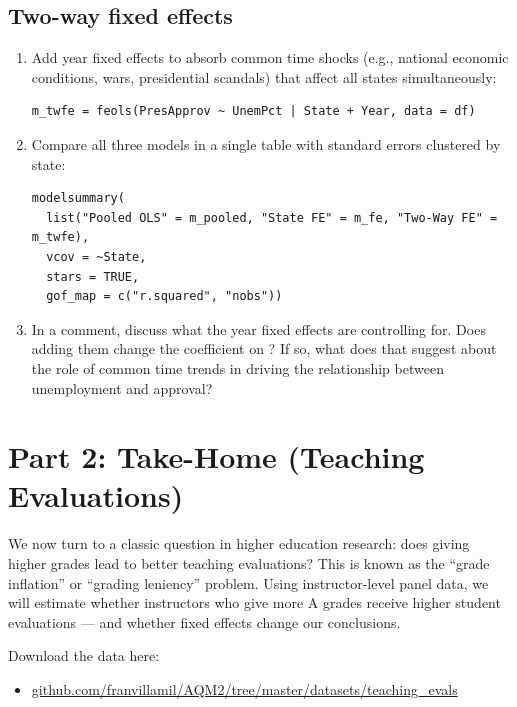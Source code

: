 \subsection{Two-way fixed effects}

\begin{enumerate}[label=\alph*)]
  \item Add year fixed effects to absorb common time shocks (e.g., national economic conditions, wars, presidential scandals) that affect all states simultaneously:
  \begin{lstlisting}
m_twfe = feols(PresApprov ~ UnemPct | State + Year, data = df)
  \end{lstlisting}
  \item Compare all three models in a single  table with standard errors clustered by state:
  \begin{lstlisting}
modelsummary(
  list("Pooled OLS" = m_pooled, "State FE" = m_fe, "Two-Way FE" = m_twfe),
  vcov = ~State,
  stars = TRUE,
  gof_map = c("r.squared", "nobs"))
  \end{lstlisting}
  \item In a comment, discuss what the year fixed effects are controlling for. Does adding them change the coefficient on ? If so, what does that suggest about the role of common time trends in driving the relationship between unemployment and approval?
\end{enumerate}

\newpage

\section{Part 2: Take-Home (Teaching Evaluations)}

We now turn to a classic question in higher education research: does giving higher grades lead to better teaching evaluations? This is known as the ``grade inflation'' or ``grading leniency'' problem. Using instructor-level panel data, we will estimate whether instructors who give more A grades receive higher student evaluations --- and whether fixed effects change our conclusions.

Download the data here:
\begin{itemize}
  \item \href{https://github.com/franvillamil/AQM2/tree/master/datasets/teaching_evals}{github.com/franvillamil/AQM2/tree/master/datasets/teaching\_evals}
\end{itemize}

